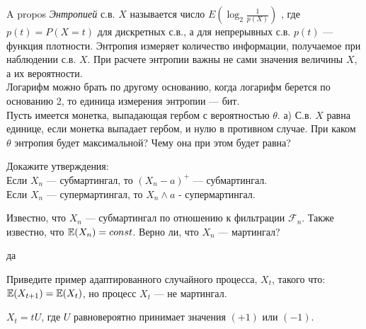 \begin{problem}
A propos
{\it Энтропией} с.в.  $X$  называется число $E\left(\log _{2}
\frac{1}{p\left(X\right)} \right)$ , где
$p\left(t\right)=P\left(X=t\right)$  для дискретных с.в., а для
непрерывных с.в.  $p\left(t\right)$  — функция плотности. Энтропия
измеряет количество информации, получаемое при наблюдении с.в.
$X$. При расчете энтропии важны не сами значения величины $X$, а
их вероятности. \\
Логарифм можно брать по другому основанию, когда логарифм берется
по основанию 2, то единица измерения энтропии — бит. \\
Пусть имеется монетка, выпадающая гербом с вероятностью  $\theta$.
а) С.в.  $X$  равна единице, если монетка выпадает гербом, и нулю
в противном случае. При каком  $\theta$  энтропия будет
максимальной? Чему она при этом будет равна?

\begin{sol}

\end{sol}
\end{problem}

\begin{problem}
Докажите утверждения: \\
Если $X_{n}$ — субмартингал, то $(X_{n}-a)^{+}$ — субмартингал. \\
Если $X_{n}$ — супермартингал, то $X_{n} \wedge a$ -
супермартингал.

\begin{sol}

\end{sol}
\end{problem}

\begin{problem}
Известно, что $X_{n}$ — субмартингал по отношению к фильтрации $\mathcal{F}_{n}$. Также известно, что $\mathbb{E}(X_{n})=const$. Верно ли, что $X_{n}$ — мартингал?

\begin{sol}
да
\end{sol}
\end{problem}

\begin{problem}
Приведите пример адаптированного случайного процесса, $X_t$, такого что: $\mathbb{E}(X_{t+1})=\mathbb{E}(X_t)$, но процесс $X_t$ — не мартингал.

\begin{sol}
$X_t=tU$, где $U$ равновероятно принимает значения $(+1)$ или $(-1)$.
\end{sol}
\end{problem}

